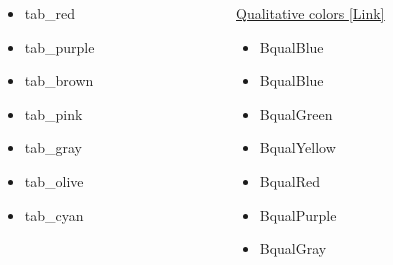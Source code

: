 \documentclass[aspectratio=1610,11pt]{beamer}
\begin{document}
\begin{frame}{\insertsection}
\begin{columns}[t]
\begin{column}{0.24\textwidth}
\begin{itemize}
            \item \textcolor{tab_red}{tab\_red}
            \item \textcolor{tab_purple}{tab\_purple}
            \item \textcolor{tab_brown}{tab\_brown}
            \item \textcolor{tab_pink}{tab\_pink}
            \item \textcolor{tab_gray}{tab\_gray}
            \item \textcolor{tab_olive}{tab\_olive}
            \item \textcolor{tab_cyan}{tab\_cyan}
            \end{itemize}
        \end{column}
        \begin{column}{0.24\textwidth}
            \underline{Qualitative colors \href{https://personal.sron.nl/~pault/}{[Link]}}
            \begin{itemize}
            \item \textcolor{BqualBlue}{BqualBlue}
            \item \textcolor{BqualCyan}{BqualBlue}
            \item \textcolor{BqualGreen}{BqualGreen}
            \item \textcolor{BqualYellow}{BqualYellow}
            \item \textcolor{BqualRed}{BqualRed}
            \item \textcolor{BqualPurple}{BqualPurple}
            \item \textcolor{BqualGrey}{BqualGray}
            \end{itemize}
        \end{column}
    \end{columns}
\end{frame}
\end{document}
